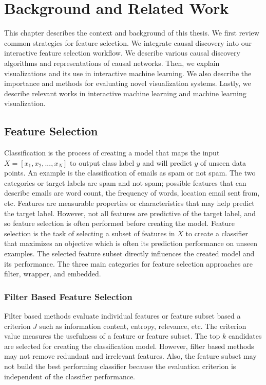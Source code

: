 \chapter{Background and Related Work}
\indent This chapter describes the context and background of this thesis. We first review common strategies for feature selection. We integrate causal discovery into our interactive feature selection workflow. We describe various causal discovery algorithms and representations of causal networks. Then, we explain visualizations and its use in interactive machine learning. We also describe the importance and methods for evaluating novel visualization systems. Lastly, we describe relevant works in interactive machine learning and machine learning visualization.

\section{Feature Selection}
\indent Classification is the process of creating a model that maps the input \(X=[x_1, x_2, ..., x_N]\) to output class label \(y\) and will predict $y$ of unseen data points. An example is the classification of emails as spam or not spam. The two categories or target labels are spam and not spam; possible features that can describe emails are word count, the frequency of words, location email sent from, etc. Features are measurable properties or characteristics that may help predict the target label. However, not all features are predictive of the target label, and so feature selection is often performed before creating the model. 
Feature selection is the task of selecting a subset of features in \(X\) to create a classifier that maximizes an objective which is often its prediction performance on unseen examples. The selected feature subset directly influences the created model and its performance. The three main categories for feature selection approaches are filter, wrapper, and embedded. 

\subsection{Filter Based Feature Selection}
Filter based methods evaluate individual features or feature subset based a criterion \(J\) such as information content, entropy, relevance, etc. The criterion value measures the usefulness of a feature or feature subset. The top \(k\) candidates are selected for creating the classification model. However, filter based methods may not remove redundant and irrelevant features. Also, the feature subset may not build the best performing classifier because the evaluation criterion is independent of the classifier performance.

